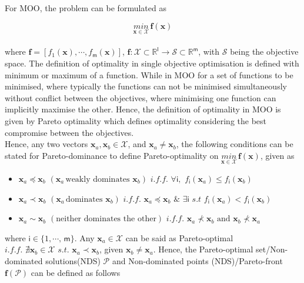 For MOO, the problem can be formulated as

\begin{equation}
\underset{\bm x \in \mathcal{X}}{min} \, \bm f(\bm x)
\end{equation}\\

where $\bm f=[f_1(\bm x),\cdots, f_{\mathsf{m}}(\bm x)]$, $\bm f:\mathcal{X}\subset \mathbb{R}^{\mathsf{l}}\rightarrow \mathcal{S}\subset\mathbb{R}^{\mathsf{m}}$, with $\mathcal{S}$ being the objective space. The definition of optimality in single objective optimisation is defined with minimum or maximum of a function. While in MOO for a set of functions to be minimised, where typically the functions can not be minimised simultaneously without conflict between the objectives, where minimising one function can implicitly maximise the other. Hence, the definition of optimality in MOO is given by Pareto optimality which defines optimality considering the best compromise between the objectives.\\

Hence, any two vectors $\bm x_a,\bm x_b\in \mathcal{X}$, and  $\bm x_a \neq \bm x_b$, the following conditions can be stated for Pareto-dominance to define Pareto-optimality on $\underset{\bm x \in \mathcal{X}}{min} \, \bm f(\bm x)$, given as

\begin{itemize}
\item $\bm x_a \preceq \bm x_b \,\, (\bm x_a \, \mathrm{weakly\,\,dominates} \,\, \bm x_b)\,\, i.f.f. \,\, \forall \mathsf{i},\,\, f_{\mathsf{i}}(\bm x_a) \leq f_{\mathsf{i}}(\bm x_b)$

\item $\bm x_a \prec \bm x_b \,\, (\bm x_a \, \mathrm{dominates} \,\, \bm x_b) \,\, i.f.f. \,\, \bm x_a \preceq \bm x_b \,\, \& \,\, \exists \mathsf{i}\,\, s.t \,\,  f_{\mathsf{i}}(\bm x_a) < f_{\mathsf{i}}(\bm x_b)$

\item $\bm x_a  \sim \bm x_b \,\, (\mathrm{neither\,\,dominates\,\,the\,\,other}) \,\, i.f.f. \,\, \bm x_a \nprec \bm x_b \,\, \mathrm{and}\,\, \bm x_b \nprec \bm x_a$
\end{itemize}

where  $\mathsf{i}\in \{1,\cdots,\,\mathsf{m}\}$. Any $\bm x_a \in \mathcal{X}$ can be said as Pareto-optimal $i.f.f. \,\, \nexists \bm x_b \in \mathcal{X} \,\, s.t. \,\, \bm x_a \prec \bm x_b$, given $\bm x_b \neq \bm x_a$. Hence, the Pareto-optimal set/Non-dominated solutions(NDS) ${\mathscr{P}}$ and Non-dominated points (NDS)/Pareto-front $\bm f(\mathscr{P})$ can be defined as follows

